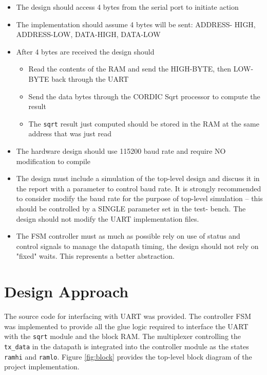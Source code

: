 \documentclass[paper=usletter, fontsize=12pt]{article}
\begin{document}
        \begin{itemize}

        \item The design should access 4 bytes from the serial port to initiate
        action

        \item The implementation should assume 4 bytes will be sent: ADDRESS-
        HIGH, ADDRESS-LOW, DATA-HIGH, DATA-LOW

        \item After 4 bytes are received the design should

        \begin{itemize}

            \item Read the contents of the RAM and send the HIGH-BYTE, then
            LOW-BYTE back through the UART

            \item Send the data bytes through the CORDIC Sqrt processor to
            compute the result

            \item The \texttt{sqrt} result just computed should be stored in
            the RAM at the same address that was just read

        \end{itemize}

        \item The hardware design should use 115200 baud rate and require NO
        modification to compile

        \item The design must include a simulation of the top-level design and
        discuss it in the report with a parameter to control baud rate. It is
        strongly recommended to consider modify the baud rate for the purpose
        of top-level simulation -- this should be controlled by a SINGLE
        parameter set in the test- bench. The design should not modify the UART
        implementation files.

        \item The FSM controller must as much as possible rely on use of status
        and control signals to manage the datapath timing, the design should
        not rely on "fixed" waits. This represents a better abstraction.

        \end{itemize}

    \section{Design Approach} The source code for interfacing with UART was
    provided. The controller FSM was implemented to provide all the glue logic
    required to interface the UART with the \texttt{sqrt} module and the block
    RAM. The multiplexer controlling the \texttt{tx\_data} in the datapath is
    integrated into the controller module as the states \texttt{ramhi} and
    \texttt{ramlo}. Figure \ref{fig:block} provides the top-level block diagram
    of the project implementation.
\end{document}

